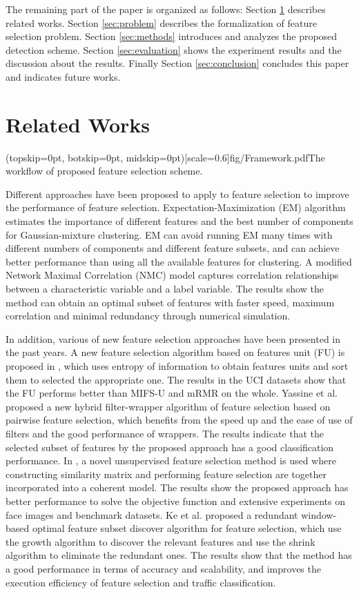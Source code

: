 \documentclass{ieeeaccess}
\theoremstyle{definition}
\begin{document}
The remaining part of the paper is organized as follows: Section \ref{sec:related} describes related works. Section \ref{sec:problem} describes the formalization of feature selection problem. Section \ref{sec:methods} introduces and analyzes the proposed detection scheme. Section \ref{sec:evaluation} shows the experiment results and the discussion about the results. Finally Section \ref{sec:conclusion} concludes this paper and indicates future works.

\section{Related Works}
\label{sec:related}

\Figure[!htpb](topskip=0pt, botskip=0pt, midskip=0pt)[scale=0.6]{fig/Framework.pdf}{The workflow of proposed feature selection scheme.\label{fig:framework}}

Different approaches have been proposed to apply to feature selection to improve the performance of feature selection. Expectation-Maximization (EM)\cite{Law2004} algorithm estimates the importance of different features and the best number of components for Gaussian-mixture clustering. EM can avoid running EM many times with different numbers of components and different feature subsets, and can achieve better performance than using all the available features for clustering. A modified Network Maximal Correlation (NMC) model\cite{Yang2018} captures correlation relationships between a characteristic variable and a label variable. The results show the method can obtain an optimal subset of features with faster speed, maximum correlation and minimal redundancy through numerical simulation.

In addition, various of new feature selection approaches have been presented in the past years. A new feature selection algorithm based on features unit (FU) is proposed in \cite{Wu2017}, which uses entropy of information to obtain features units and sort them to selected the appropriate one. The results in the UCI datasets show that the FU performs better than MIFS-U and mRMR on the whole. Yassine et al.\cite{Yassine2017} proposed a new hybrid filter-wrapper algorithm of feature selection based on pairwise feature selection, which benefits from the speed up and the ease of use of filters and the good performance of wrappers. The results indicate that the selected subset of features by the proposed approach has a good classification performance. In \cite{Yang2018a}, a novel unsupervised feature selection method is used where constructing similarity matrix and performing feature selection are together incorporated into a coherent model. The results show the proposed approach has better performance to solve the objective function and extensive experiments on face images and benchmark datasets. Ke et al.\cite{Ke2018} proposed a redundant window-based optimal feature subset discover algorithm for feature selection, which use the growth algorithm to discover the relevant features and use the shrink algorithm to eliminate the redundant ones. The results show that the method has a good performance in terms of accuracy and scalability, and improves the execution efficiency of feature selection and traffic classification.
\end{document}
